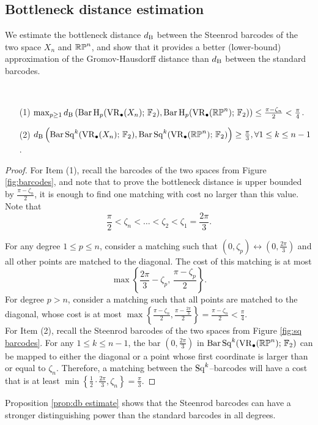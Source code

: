 \subsection{Bottleneck distance estimation}

We estimate the bottleneck distance $d_{\mathrm{B}}$ between the Steenrod barcodes of the two space $X_n$ and $\mathbb{RP}^n$, and show that it provides a better (lower-bound) approximation of the Gromov-Hausdorff distance than $d_{\mathrm{B}}$ between the standard barcodes.

\begin{theorem}\label{prop:db estimate}
	\ \par
	\begin{itemize}
		\item[(1)] $\max_{p\geq 1}d_{\mathrm{B}}\left(\operatorname{Bar} \operatorname{H}_{p}(\operatorname{VR}_\bullet(X_n);\,{\mathbb{F}_2}), \operatorname{Bar} \operatorname{H}_{p}(\operatorname{VR}_\bullet(\mathbb{RP}^n);\,{\mathbb{F}_2})\right)\leq \frac{\pi-\zeta_n}{2}<\frac{\pi}{4}$.
		\smallskip\item[(2)] $d_{\mathrm{B}}\left(\operatorname{Bar}\operatorname{Sq}^{k}(\operatorname{VR}_\bullet(X_n);\,{\mathbb{F}_2}), \operatorname{Bar}\operatorname{Sq}^{k}(\operatorname{VR}_\bullet(\mathbb{RP}^n);\,{\mathbb{F}_2})\right)\geq \frac{\pi}{3},\forall 1\leq k\leq n-1$.
	\end{itemize}
\end{theorem}

\begin{proof}
	For Item (1), recall the barcodes of the two spaces from Figure \ref{fig:barcodes}, and note that to prove the bottleneck distance is upper bounded by $\frac{\pi-\zeta_n}{2}$, it is enough to find one matching with cost no larger than this value. Note that
	\[\frac{\pi}{2}<\zeta_n<\dots<\zeta_2<\zeta_1 =\frac{2\pi}{3}.\]

	For any degree $1\leq p\leq n$, consider a matching such that $(0,\zeta_p)\leftrightarrow \left(0,\frac{2\pi}{3}\right)$ and all other points are matched to the diagonal. The cost of this matching is at most
	\[\max\left\{\frac{2\pi}{3}-\zeta_p,\,\frac{\pi-\zeta_p}{2}\right\}.\]
	For degree $p>n$, consider a matching such that all points are matched to the diagonal, whose cost is at most $\max\left\{ \frac{\pi-\zeta_n}{2}, \frac{\pi-\frac{2\pi}{3}}{2}\right\} = \frac{\pi-\zeta_n}{2}<\frac{\pi}{4}.$ \\

	For Item (2), recall the Steenrod barcodes of the two spaces from Figure \ref{fig:sq barcodes}. For any $1\leq k\leq n-1$, the bar $\left(0,\frac{2\pi}{3}\right)$ in $\operatorname{Bar}\operatorname{Sq}^{k}(\operatorname{VR}_\bullet(\mathbb{RP}^n);\,{\mathbb{F}_2})$ can be mapped to either the diagonal or a point whose first coordinate is larger than or equal to $\zeta_n$. Therefore, a matching between the $\operatorname{Sq}^k$--barcodes will have a cost that is at least $\min\left\{\frac{1}{2}\cdot\frac{2\pi}{3}, \zeta_n\right\} = \frac{\pi}{3}.$
\end{proof}

Proposition \ref{prop:db estimate} shows that the Steenrod barcodes can have a stronger distinguishing power than the standard barcodes in all degrees.